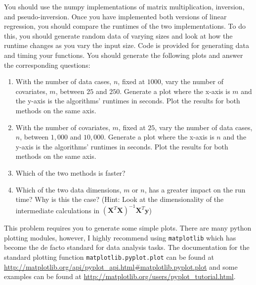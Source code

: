 \documentclass[11pt]{article} %
\begin{document}
You should use the numpy implementations of matrix multiplication, inversion, and pseudo-inversion. Once you have implemented both versions of linear regression, you should compare the runtimes of the two implementations. To do this, you should generate random data of varying sizes and look at how the runtime changes as you vary the input size. Code is provided for generating data and timing your functions. You should generate the following plots and answer the corresponding questions:

\begin{enumerate}
	\item With the number of data cases, $n$, fixed at $1000$, vary the number of covariates, $m$, between $25$ and $250$. Generate a plot where the x-axis is $m$ and the y-axis is the algorithms' runtimes in seconds. Plot the results for both methods on the same axis.
	\item With the number of covariates, $m$, fixed at $25$, vary the number of data cases, $n$, between $1,000$ and $10,000$. Generate a plot where the x-axis is $n$ and the y-axis is the algorithms' runtimes in seconds. Plot the results for both methods on the same axis.
	\item Which of the two methods is faster?
	\item Which of the two data dimensions, $m$ or $n$, has a greater impact on the run time? Why is this the case? (Hint: Look at the dimensionality of the intermediate calculations in $(\mathbf{X}^T\mathbf{X})^{-1}\mathbf{X}^T\mathbf{y}$)
\end{enumerate}

This problem requires you to generate some simple plots. There are many python plotting modules, however, I highly recommend using \verb|matplotlib| which has become the de facto standard for data analysis tasks. The documentation for the standard plotting function \verb|matplotlib.pyplot.plot| can be found at \url{http://matplotlib.org/api/pyplot_api.html#matplotlib.pyplot.plot} and some examples can be found at \url{http://matplotlib.org/users/pyplot_tutorial.html}.
\end{document}
